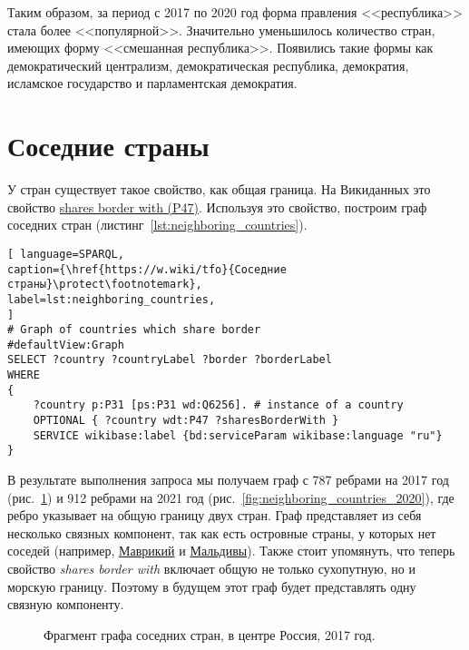 Таким образом, за период с 2017 по 2020 год форма правления <<республика>> стала более <<популярной>>. Значительно уменьшилось количество стран, имеющих форму  <<смешанная республика>>. Появились такие формы как демократический централизм, демократическая республика, демократия, исламское государство и парламентская демократия.

\section{Соседние страны}

У стран существует такое свойство, как общая граница. На Викиданных это свойство  \href{https://www.wikidata.org/wiki/Property:P47}{shares border with (P47)}. Используя это свойство, построим граф соседних стран (листинг~\ref{lst:neighboring_countries}).
\begin{lstlisting}[ language=SPARQL, 
caption={\href{https://w.wiki/tfo}{Соседние страны}\protect\footnotemark},
label=lst:neighboring_countries, 
]
# Graph of countries which share border
#defaultView:Graph
SELECT ?country ?countryLabel ?border ?borderLabel
WHERE
{
	?country p:P31 [ps:P31 wd:Q6256]. # instance of a country
	OPTIONAL { ?country wdt:P47 ?sharesBorderWith }
	SERVICE wikibase:label {bd:serviceParam wikibase:language "ru"}
}
\end{lstlisting}


В результате выполнения запроса мы получаем граф с 787 ребрами на 2017 год (рис.~\ref{fig:neighboring_countries_2017}) и 912 ребрами на 2021 год (рис.~\ref{fig:neighboring_countries_2020}), где ребро указывает на общую границу двух стран. Граф представляет из себя несколько связных компонент, так как есть островные страны, у которых нет соседей (например, \href{https://w.wiki/vC7}{Маврикий} и \href{https://w.wiki/vC8}{Мальдивы}). Также стоит упомянуть, что теперь свойство {\textit{shares border with}} включает общую не только сухопутную, но и морскую границу. Поэтому в будущем этот граф будет представлять одну связную компоненту. 

\begin{figure}
	{
		\setlength{\fboxsep}{0pt}%
		\setlength{\fboxrule}{1pt}%
	}
    \caption[Фрагмент графа соседних стран, 2017 год.]{Фрагмент графа соседних стран, в центре Россия, 2017 год.}
	\label{fig:neighboring_countries_2017}%
\end{figure}

